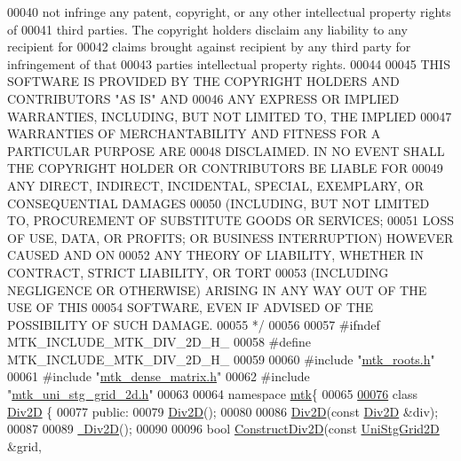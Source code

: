 \begin{DoxyCode}
00040 \textcolor{comment}{not infringe any patent, copyright, or any other intellectual property rights of}
00041 \textcolor{comment}{third parties. The copyright holders disclaim any liability to any recipient for}
00042 \textcolor{comment}{claims brought against recipient by any third party for infringement of that}
00043 \textcolor{comment}{parties intellectual property rights.}
00044 \textcolor{comment}{}
00045 \textcolor{comment}{THIS SOFTWARE IS PROVIDED BY THE COPYRIGHT HOLDERS AND CONTRIBUTORS "AS IS" AND}
00046 \textcolor{comment}{ANY EXPRESS OR IMPLIED WARRANTIES, INCLUDING, BUT NOT LIMITED TO, THE IMPLIED}
00047 \textcolor{comment}{WARRANTIES OF MERCHANTABILITY AND FITNESS FOR A PARTICULAR PURPOSE ARE}
00048 \textcolor{comment}{DISCLAIMED. IN NO EVENT SHALL THE COPYRIGHT HOLDER OR CONTRIBUTORS BE LIABLE FOR}
00049 \textcolor{comment}{ANY DIRECT, INDIRECT, INCIDENTAL, SPECIAL, EXEMPLARY, OR CONSEQUENTIAL DAMAGES}
00050 \textcolor{comment}{(INCLUDING, BUT NOT LIMITED TO, PROCUREMENT OF SUBSTITUTE GOODS OR SERVICES;}
00051 \textcolor{comment}{LOSS OF USE, DATA, OR PROFITS; OR BUSINESS INTERRUPTION) HOWEVER CAUSED AND ON}
00052 \textcolor{comment}{ANY THEORY OF LIABILITY, WHETHER IN CONTRACT, STRICT LIABILITY, OR TORT}
00053 \textcolor{comment}{(INCLUDING NEGLIGENCE OR OTHERWISE) ARISING IN ANY WAY OUT OF THE USE OF THIS}
00054 \textcolor{comment}{SOFTWARE, EVEN IF ADVISED OF THE POSSIBILITY OF SUCH DAMAGE.}
00055 \textcolor{comment}{*/}
00056 
00057 \textcolor{preprocessor}{#ifndef MTK\_INCLUDE\_MTK\_DIV\_2D\_H\_}
00058 \textcolor{preprocessor}{#define MTK\_INCLUDE\_MTK\_DIV\_2D\_H\_}
00059 
00060 \textcolor{preprocessor}{#include "\hyperlink{mtk__roots_8h}{mtk\_roots.h}"}
00061 \textcolor{preprocessor}{#include "\hyperlink{mtk__dense__matrix_8h}{mtk\_dense\_matrix.h}"}
00062 \textcolor{preprocessor}{#include "\hyperlink{mtk__uni__stg__grid__2d_8h}{mtk\_uni\_stg\_grid\_2d.h}"}
00063 
00064 \textcolor{keyword}{namespace }\hyperlink{namespacemtk}{mtk}\{
00065 
\hypertarget{mtk__div__2d_8h_source_l00076}{}\hyperlink{classmtk_1_1Div2D}{00076} \textcolor{keyword}{class }\hyperlink{classmtk_1_1Div2D}{Div2D} \{
00077  \textcolor{keyword}{public}:
00079   \hyperlink{classmtk_1_1Div2D_a124b888d5889538977e1a47d2fec78ff}{Div2D}();
00080 
00086   \hyperlink{classmtk_1_1Div2D_a124b888d5889538977e1a47d2fec78ff}{Div2D}(\textcolor{keyword}{const} \hyperlink{classmtk_1_1Div2D}{Div2D} &div);
00087 
00089   \hyperlink{classmtk_1_1Div2D_a5c10c0d7b974841e923ebe3fda67c468}{~Div2D}();
00090 
00096   \textcolor{keywordtype}{bool} \hyperlink{classmtk_1_1Div2D_a4214055909a6b94fcb9d657cc839055f}{ConstructDiv2D}(\textcolor{keyword}{const} \hyperlink{classmtk_1_1UniStgGrid2D}{UniStgGrid2D} &grid,

\end{DoxyCode}
